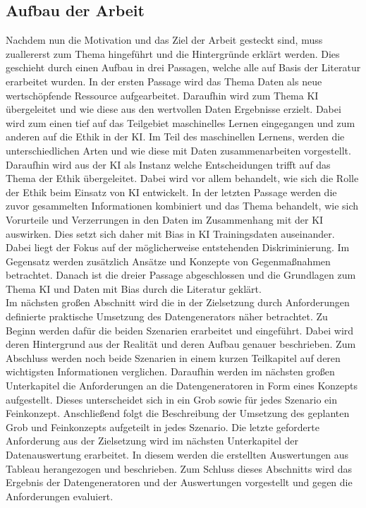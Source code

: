 \begin{onehalfspace}
    \newpage
    \section{Aufbau der Arbeit}
    \label{subsec:aufbau der arbeit}
    Nachdem nun die Motivation und das Ziel der Arbeit gesteckt sind, muss zuallererst zum Thema hingeführt und die Hintergründe erklärt werden. Dies geschieht durch einen Aufbau in drei Passagen, welche alle auf Basis der Literatur erarbeitet wurden. In der ersten Passage wird das Thema Daten als neue wertschöpfende Ressource aufgearbeitet. Daraufhin wird zum Thema \ac*{KI} übergeleitet und wie diese aus den wertvollen Daten Ergebnisse erzielt. Dabei wird zum einen tief auf das Teilgebiet maschinelles Lernen eingegangen und zum anderen auf die Ethik in der \ac*{KI}. Im Teil des maschinellen Lernens, werden die unterschiedlichen Arten und wie diese mit Daten zusammenarbeiten vorgestellt. Daraufhin wird aus der \ac*{KI} als Instanz welche Entscheidungen trifft auf das Thema der Ethik übergeleitet. Dabei wird vor allem behandelt, wie sich die Rolle der Ethik beim Einsatz von \ac*{KI} entwickelt. In der letzten Passage werden die zuvor gesammelten Informationen kombiniert und das Thema behandelt, wie sich Vorurteile und Verzerrungen in den Daten im Zusammenhang mit der \ac*{KI} auswirken. Dies setzt sich daher mit Bias in \ac*{KI} Trainingsdaten auseinander. Dabei liegt der Fokus auf der möglicherweise entstehenden Diskriminierung. Im Gegensatz werden zusätzlich Ansätze und Konzepte von Gegenmaßnahmen betrachtet. Danach ist die dreier Passage abgeschlossen und die Grundlagen zum Thema \ac*{KI} und Daten mit Bias durch die Literatur geklärt.\\
    Im nächsten großen Abschnitt wird die in der Zielsetzung durch Anforderungen definierte praktische Umsetzung des Datengenerators näher betrachtet. Zu Beginn werden dafür die beiden Szenarien erarbeitet und eingeführt. Dabei wird deren Hintergrund aus der Realität und deren Aufbau genauer beschrieben. Zum Abschluss werden noch beide Szenarien in einem kurzen Teilkapitel auf deren wichtigsten Informationen verglichen. Daraufhin werden im nächsten großen Unterkapitel die Anforderungen an die Datengeneratoren in Form eines Konzepts aufgestellt. Dieses unterscheidet sich in ein Grob sowie für jedes Szenario ein Feinkonzept. Anschließend folgt die Beschreibung der Umsetzung des geplanten Grob und Feinkonzepts aufgeteilt in jedes Szenario. Die letzte geforderte Anforderung aus der Zielsetzung wird im nächsten Unterkapitel der Datenauswertung erarbeitet. In diesem werden die erstellten Auswertungen aus Tableau herangezogen und beschrieben. Zum Schluss dieses Abschnitts wird das Ergebnis der Datengeneratoren und der Auswertungen vorgestellt und gegen die Anforderungen evaluiert.\\

\end{onehalfspace}
